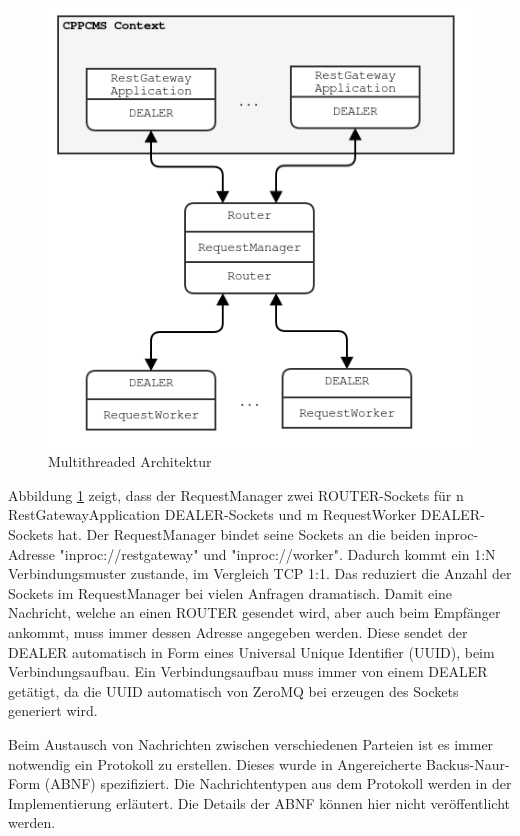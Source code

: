\documentclass{article}
\begin{document}
\begin{figure}[h]
\centering
\includegraphics[scale=0.5]{Threads.png}
\caption{Multithreaded Architektur}
\label{fig:architektur_requests}
\end{figure}

Abbildung \ref{fig:architektur_requests} zeigt, dass der RequestManager zwei ROUTER-Sockets für n RestGatewayApplication DEALER-Sockets und m RequestWorker DEALER-Sockets hat. Der RequestManager bindet seine Sockets an die beiden inproc-Adresse "inproc://restgateway" und "inproc://worker". Dadurch kommt ein 1:N Verbindungsmuster zustande, im Vergleich TCP 1:1. Das reduziert die Anzahl der Sockets im RequestManager bei vielen Anfragen dramatisch. Damit eine Nachricht, welche an einen ROUTER gesendet wird, aber auch beim Empfänger ankommt, muss immer dessen Adresse angegeben werden. Diese sendet der DEALER automatisch in Form eines Universal Unique Identifier (UUID), beim Verbindungsaufbau. Ein Verbindungsaufbau muss immer von einem DEALER getätigt, da die UUID automatisch von ZeroMQ bei erzeugen des Sockets generiert wird.

Beim Austausch von Nachrichten zwischen verschiedenen Parteien ist es immer notwendig ein Protokoll zu erstellen. Dieses wurde in Angereicherte Backus-Naur-Form (ABNF) spezifiziert. Die Nachrichtentypen aus dem Protokoll werden in der Implementierung erläutert. Die Details der ABNF können hier nicht veröffentlicht werden.
\end{document}
